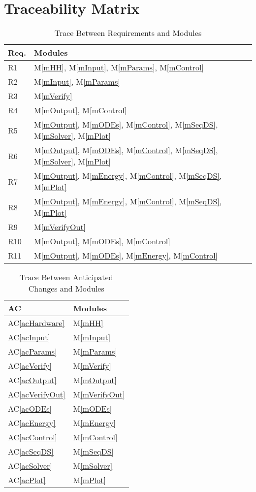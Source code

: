 \documentclass[12pt, titlepage]{article}
\newcommand{\acref}[1]{AC\ref{#1}}
\newcommand{\mref}[1]{M\ref{#1}}
\begin{document}
\section{Traceability Matrix} \label{SecTM}
\begin{table}[H]
\centering
\begin{tabular}{p{} p{}}
\toprule
\textbf{Req.} & \textbf{Modules}\\
\midrule
R1 & \mref{mHH}, \mref{mInput}, \mref{mParams}, \mref{mControl}\\
R2 & \mref{mInput}, \mref{mParams}\\
R3 & \mref{mVerify}\\
R4 & \mref{mOutput}, \mref{mControl}\\
R5 & \mref{mOutput}, \mref{mODEs}, \mref{mControl}, \mref{mSeqDS}, \mref{mSolver}, \mref{mPlot}\\
R6 & \mref{mOutput}, \mref{mODEs}, \mref{mControl}, \mref{mSeqDS}, \mref{mSolver}, \mref{mPlot}\\
R7 & \mref{mOutput}, \mref{mEnergy}, \mref{mControl}, \mref{mSeqDS}, \mref{mPlot}\\
R8 & \mref{mOutput}, \mref{mEnergy}, \mref{mControl}, \mref{mSeqDS}, \mref{mPlot}\\
R9 & \mref{mVerifyOut}\\
R10 & \mref{mOutput}, \mref{mODEs}, \mref{mControl}\\
R11 & \mref{mOutput}, \mref{mODEs}, \mref{mEnergy}, \mref{mControl}\\
\bottomrule
\end{tabular}
\caption{Trace Between Requirements and Modules}
\label{TblRT}
\end{table}
\begin{table}[H]
\centering
\begin{tabular}{p{} p{}}
\toprule
\textbf{AC} & \textbf{Modules}\\
\midrule
\acref{acHardware} & \mref{mHH}\\
\acref{acInput} & \mref{mInput}\\
\acref{acParams} & \mref{mParams}\\
\acref{acVerify} & \mref{mVerify}\\
\acref{acOutput} & \mref{mOutput}\\
\acref{acVerifyOut} & \mref{mVerifyOut}\\
\acref{acODEs} & \mref{mODEs}\\
\acref{acEnergy} & \mref{mEnergy}\\
\acref{acControl} & \mref{mControl}\\
\acref{acSeqDS} & \mref{mSeqDS}\\
\acref{acSolver} & \mref{mSolver}\\
\acref{acPlot} & \mref{mPlot}\\
\bottomrule
\end{tabular}
\caption{Trace Between Anticipated Changes and Modules}
\label{TblACT}
\end{table}
\end{document}
